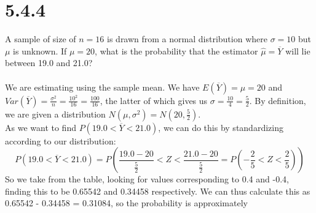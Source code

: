\documentclass{article}
\begin{document}
{\section*{5.4.4}
A sample of size of \(n = 16\) is drawn from a normal distribution where \(\sigma = 10\) but \(\mu\) is unknown. If \(\mu = 20\), what is the probability that the estimator \( \hat{\mu} = \overline{Y} \) will lie between 19.0 and 21.0?
\\
\\
We are estimating using the sample mean. We have \(E(\overline{Y}) = \mu = 20\) and \( Var(\overline{Y}) = \frac{\sigma^2}{n} = \frac{10^2}{16} = \frac{100}{16}\), the latter of which gives us \( \sigma = \frac{10}{4} = \frac{5}{2} \). By definition, we are given a distribution \(N(\mu, \sigma^2) = N(20, \frac{5}{2})\). 
\\
As we want to find \(P(19.0 < \overline{Y} < 21.0)\), we can do this by standardizing according to our distribution:
\[
P( 19.0 < \overline{Y} < 21.0) = P( \frac{19.0 - 20}{\frac{5}{2}} < Z < \frac{21.0 - 20}{\frac{5}{2}} = P(-\frac{2}{5} < Z < \frac{2}{5}))
\]
So we take from the table, looking for values corresponding to 0.4 and -0.4, finding this to be 0.65542 and 0.34458 respectively. We can thus calculate this as 0.65542 - 0.34458 = 0.31084, so the probability is approximately 

}
\end{document}
